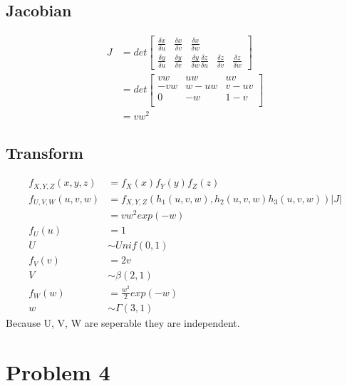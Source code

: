\documentclass[12pt]{article}
\begin{document}
\subsection{Jacobian}
\begin{align*}
  J &= det\begin{bmatrix}
    \frac{\delta x}{\delta u} & \frac{\delta x}{\delta v} & \frac{\delta x}{\delta w} \\
    \frac{\delta y}{\delta u} & \frac{\delta y}{\delta v} & \frac{\delta y}{\delta w}
    \frac{\delta z}{\delta u} & \frac{\delta z}{\delta v} & \frac{\delta z}{\delta w}
  \end{bmatrix} \\
  &= det\begin{bmatrix}
    vw & uw & uv \\
    -vw & w-uw & v-uv \\
    0 & -w & 1-v \\
  \end{bmatrix} \\
  &= vw^2
\end{align*}

\subsection{Transform}
\begin{align*}
  f_{X,Y,Z}(x,y,z) &= f_X(x)f_Y(y)f_Z(z) \\
  f_{U,V,W}(u,v,w) &= f_{X,Y,Z}(h_1(u,v,w),h_2(u,v,w)h_3(u,v,w))|J| \\
  &= vw^2exp(-w) \\
  f_U(u) &= 1 \\
  U &\sim Unif(0,1) \\
  f_V(v) &= 2v \\
  V &\sim \beta(2,1) \\
  f_W(w) &= \frac{w^2}{2}exp(-w) \\
  w &\sim \Gamma(3,1)
\end{align*}
Because U, V, W are seperable they are independent.

\section{Problem 4}
\end{document}

